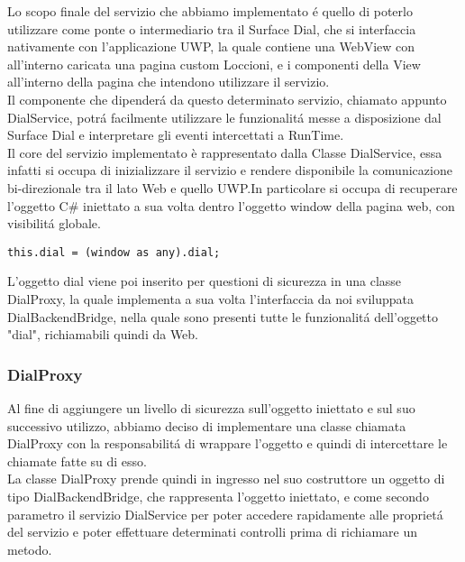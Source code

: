 Lo scopo finale del servizio che abbiamo implementato é quello di poterlo utilizzare come ponte o intermediario tra il Surface Dial, che si interfaccia nativamente con l'applicazione UWP, la quale contiene una WebView con all'interno caricata una pagina custom Loccioni, e i componenti della View all'interno della pagina che intendono utilizzare il servizio.\\

Il componente che dipenderá da questo determinato servizio, chiamato appunto DialService, potrá facilmente utilizzare le funzionalitá messe a disposizione dal Surface Dial e interpretare gli eventi intercettati a RunTime.\\

Il core del servizio implementato è rappresentato dalla Classe DialService, essa infatti si occupa di inizializzare il servizio e rendere disponibile la comunicazione bi-direzionale tra il lato Web e quello UWP.In particolare si occupa di recuperare l'oggetto C\# iniettato a sua volta dentro l'oggetto window della pagina web, con visibilitá globale.\\

\vspace{1.0cm}
\begin{lstlisting}[caption={Recupero oggetto C\#},style=javaScriptCode]
	this.dial = (window as any).dial;
\end{lstlisting} 
\vspace{1.0cm}

L'oggetto dial viene poi inserito per questioni di sicurezza in una classe DialProxy, la quale implementa a sua volta l'interfaccia da noi sviluppata DialBackendBridge, nella quale sono presenti tutte le funzionalitá dell'oggetto "dial", richiamabili quindi da Web.

\subsubsection{DialProxy}

Al fine di aggiungere un livello di sicurezza sull’oggetto iniettato e sul suo successivo utilizzo, abbiamo deciso di implementare una classe chiamata DialProxy con la responsabilitá di wrappare l’oggetto e quindi di intercettare le chiamate fatte su di esso.\\

La classe DialProxy prende quindi in ingresso nel suo costruttore un oggetto di tipo DialBackendBridge, che rappresenta l'oggetto iniettato, e come secondo parametro il servizio DialService per poter accedere rapidamente alle proprietá del servizio e poter effettuare determinati controlli prima di richiamare un metodo.\\

